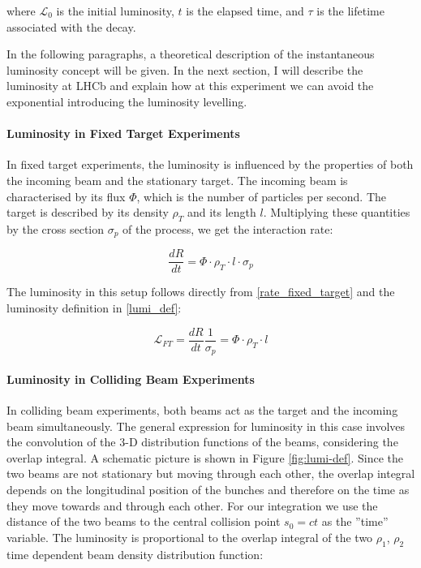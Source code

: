 where $\mathcal{L}_0$ is the initial luminosity, \(t\) is the elapsed time, and \(\tau\) is the lifetime associated with the decay. 

In the following paragraphs, a theoretical description of the instantaneous luminosity concept will be given.
In the next section, I will describe the luminosity at LHCb and explain how at this experiment we can avoid the exponential introducing the luminosity levelling.

\paragraph{Luminosity in Fixed Target Experiments}
In fixed target experiments, the luminosity is influenced by the properties of both the incoming beam and the stationary target. The incoming beam is characterised by its flux $\Phi$, which is the number of particles per second. The target is described by its density $\rho_T$ and its length $l$. 
Multiplying these quantities by the cross section $\sigma_p$ of the process, we get the interaction rate:

\begin{equation}
\frac{dR}{dt} = \Phi \cdot \rho_T \cdot l \cdot \sigma_p\label{rate_fixed_target}
\end{equation}

The luminosity in this setup follows directly from \eqref{rate_fixed_target} and the luminosity definition in \eqref{lumi_def}:

\begin{equation}
\mathcal{L}_{FT} = \frac{dR}{dt}\frac{1}{\sigma_p} = \Phi \cdot \rho_T \cdot l
\end{equation}

\paragraph{Luminosity in Colliding Beam Experiments}
In colliding beam experiments, both beams act as the target and the incoming beam simultaneously. The general expression for luminosity in this case involves the convolution of the 3-D distribution functions of the beams, considering the overlap integral. A schematic picture is shown in Figure \ref{fig:lumi-def}\cite{Herr:941318}. Since the two beams are not stationary but moving through each other, the overlap integral depends on the longitudinal position of the bunches and therefore on the time as they move towards and through each other. For our integration we use the distance of the two beams to the central collision point $s_0 = ct$ as the ”time” variable. 
The luminosity is proportional to the overlap integral of the two  $\rho_1$, $\rho_2$ time dependent beam density distribution function:

